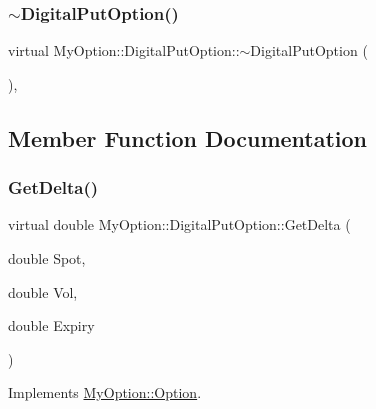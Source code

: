 \hypertarget{classMyOption_1_1DigitalPutOption_af373736d79c052e94761072593e37648}{}\label{classMyOption_1_1DigitalPutOption_af373736d79c052e94761072593e37648} 
\subsubsection{\texorpdfstring{$\sim$\+Digital\+Put\+Option()}{~DigitalPutOption()}}
{\footnotesize\ttfamily virtual My\+Option\+::\+Digital\+Put\+Option\+::$\sim$\+Digital\+Put\+Option (\begin{DoxyParamCaption}{ }\end{DoxyParamCaption})\hspace{0.3cm}{\ttfamily [inline]}, {\ttfamily [virtual]}}



\subsection{Member Function Documentation}
\hypertarget{classMyOption_1_1DigitalPutOption_a20e33b1b8a221ea2200fd08f3c691c4a}{}\label{classMyOption_1_1DigitalPutOption_a20e33b1b8a221ea2200fd08f3c691c4a} 
\subsubsection{\texorpdfstring{Get\+Delta()}{GetDelta()}}
{\footnotesize\ttfamily virtual double My\+Option\+::\+Digital\+Put\+Option\+::\+Get\+Delta (\begin{DoxyParamCaption}\item[{double}]{Spot,  }\item[{double}]{Vol,  }\item[{double}]{Expiry }\end{DoxyParamCaption})\hspace{0.3cm}{\ttfamily [virtual]}}



Implements \hyperlink{classMyOption_1_1Option_a4947bde99bb5e46b79aa0f36fd353d9b}{My\+Option\+::\+Option}.

